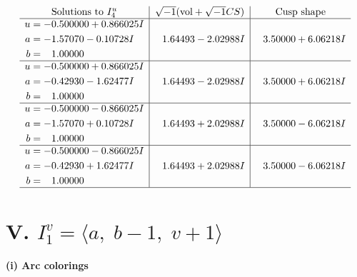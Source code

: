 \documentclass[1p]{elsarticle_modified}
\theoremstyle{definition}
\newcommand{\I}{\sqrt{-1}}
\begin{document}
$$\begin{array}{c|c|c}  
\text{Solutions to }I^u_{4}& \I (\text{vol} + \sqrt{-1}CS) & \text{Cusp shape}\\
 \hline 
\begin{aligned}
u &= -0.500000 + 0.866025 I \\
a &= -1.57070 - 0.10728 I \\
b &= \phantom{-}1.00000\phantom{ +0.000000I}\end{aligned}
 & \phantom{-}1.64493 - 2.02988 I & \phantom{-}3.50000 + 6.06218 I \\ \hline\begin{aligned}
u &= -0.500000 + 0.866025 I \\
a &= -0.42930 - 1.62477 I \\
b &= \phantom{-}1.00000\phantom{ +0.000000I}\end{aligned}
 & \phantom{-}1.64493 - 2.02988 I & \phantom{-}3.50000 + 6.06218 I \\ \hline\begin{aligned}
u &= -0.500000 - 0.866025 I \\
a &= -1.57070 + 0.10728 I \\
b &= \phantom{-}1.00000\phantom{ +0.000000I}\end{aligned}
 & \phantom{-}1.64493 + 2.02988 I & \phantom{-}3.50000 - 6.06218 I \\ \hline\begin{aligned}
u &= -0.500000 - 0.866025 I \\
a &= -0.42930 + 1.62477 I \\
b &= \phantom{-}1.00000\phantom{ +0.000000I}\end{aligned}
 & \phantom{-}1.64493 + 2.02988 I & \phantom{-}3.50000 - 6.06218 I\\
 \hline 
 \end{array}$$\newpage\newpage\renewcommand{\arraystretch}{1}
\centering \section*{V. $I^v_{1}= \langle a,\;b-1,\;v+1 \rangle$}
\flushleft \textbf{(i) Arc colorings}\\
\end{document}
